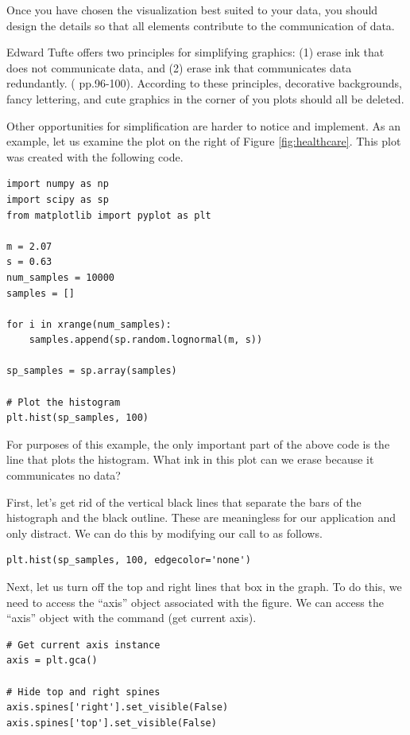Once you have chosen the visualization best suited to your data, you should design the details so that all elements contribute to the communication of data. 

Edward Tufte offers two principles for simplifying graphics: (1) erase ink that does not communicate data, and (2) erase ink that communicates data redundantly.  (\cite{tufte2001} pp.96-100). According to these principles, decorative backgrounds, fancy lettering, and cute graphics in the corner of you plots should all be deleted.

Other opportunities for simplification are harder to notice and implement. As an example, let us examine the plot on the right of Figure \ref{fig:healthcare}. 
This plot was created with the following code.

\begin{lstlisting}
import numpy as np
import scipy as sp
from matplotlib import pyplot as plt

m = 2.07
s = 0.63
num_samples = 10000
samples = []

for i in xrange(num_samples):
    samples.append(sp.random.lognormal(m, s)) 

sp_samples = sp.array(samples)

# Plot the histogram
plt.hist(sp_samples, 100)
\end{lstlisting}

For purposes of this example, the only important part of the above code is the line  that plots the histogram. 
What ink in this plot can we erase because it communicates no data?

First, let's get rid of the vertical black lines that separate the bars of the histograph and the black outline. These are meaningless for our application and only distract. 
We can do this by modifying our call to  as follows.

\begin{lstlisting}
plt.hist(sp_samples, 100, edgecolor='none')
\end{lstlisting}

Next, let us turn off the top and right lines that box in the graph. 
To do this, we need to access the ``axis'' object associated with the figure. 
We can access the ``axis'' object with the command  (get current axis).

\begin{lstlisting}
# Get current axis instance
axis = plt.gca()

# Hide top and right spines
axis.spines['right'].set_visible(False)
axis.spines['top'].set_visible(False)
\end{lstlisting}

